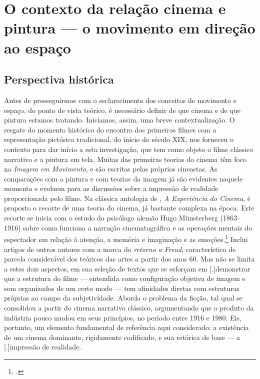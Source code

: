 
\chapter{O contexto da relação cinema e pintura --- o movimento em direção ao espaço}%
\label{cap1-contexto-relacao-cinema-pintura}
\pagestyle{headings}

\section{Perspectiva histórica}%
\label{sec-perspectiva-historica}

Antes de prosseguirmos com o esclarecimento dos conceitos de movimento
e espaço, do ponto de vista teórico, é necessário definir de que cinema
e de que pintura estamos tratando. Iniciamos, assim, uma breve
contextualização. O resgate do momento histórico do encontro dos
primeiros filmes com a representação pictórica tradicional, do início
do século XIX, nos forneceu o contexto para dar início a esta
investigação, que tem como objeto o filme clássico narrativo e a
pintura em tela. Muitas das primeiras teorias do cinema têm foco na
\emph{Imagem em Movimento}, e são escritas pelos próprios cineastas. As
comparações com a pintura e com teorias da imagem já são evidentes
naquele momento e evoluem para as discussões sobre a impressão de
realidade proporcionada pelo filme. 
Na clássica antologia de \textcite{xavier1983experiencia}, \emph{A
	Experiência do Cinema}, é proposto o recorte de uma teoria do cinema,
já bastante complexa na época. Este recorte se inicia com o estudo do
psicólogo alemão Hugo Münsterberg (1863--1916) sobre como funciona a
narração cinematográfica e as operações mentais do espectador em
relação à atenção, a memória e imaginação e as emoções.\footcite[Para
	saber mais sobre Münsterberg e Rudolf Arnhein, consulte][]
  {pedro2013percepcao} Inclui artigos de outros autores com a
marca do \emph{retorno a Freud}, característico de parcela considerável
dos teóricos das artes a partir dos anos 60. Mas
\textcite{xavier1983experiencia} não se limita a estes dois aspectos,
em sua seleção de textos que se esforçam em
[.]{demonstrar que a estrutura do
	filme --- entendida como configuração objetiva de imagem e som
	organizados de um certo modo --- tem afinidades diretas com estruturas
	próprias ao campo da subjetividade}. Aborda o problema da ficção, tal
qual se consolidou a partir do cinema narrativo clássico, argumentando
que o produto da indústria pouco mudou em seus princípios, no período
entre 1916 e 1980. Eis, portanto, um elemento fundamental de referência
aqui considerado: a existência de um cinema dominante, rigidamente
codificado, e sua retórica de base --- a
[.]{impressão de realidade}.

